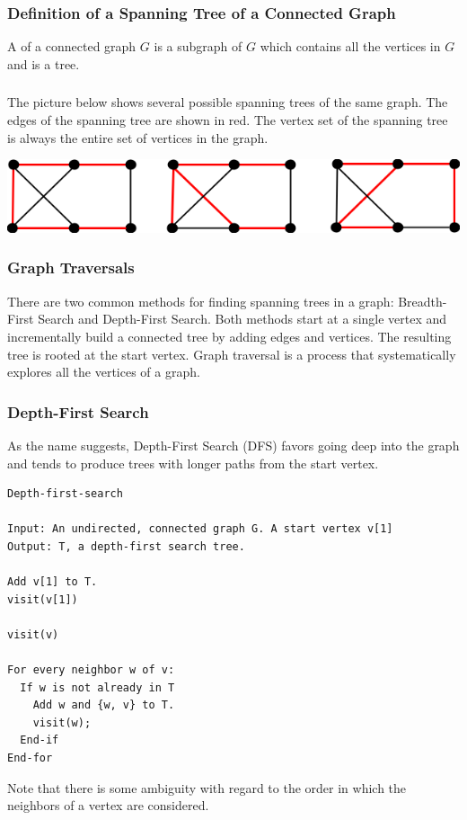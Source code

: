 \subsubsection*{Definition of a Spanning Tree of a Connected Graph}
A  of a connected graph $G$ is a subgraph of $G$ which contains all the vertices in $G$ and is a tree.

\subsubsection*{}
The picture below shows several possible spanning trees of the same graph. The edges of the spanning tree are shown in red. The vertex set of the spanning tree is always the entire set of vertices in the graph.
\begin{center}
  \includegraphics[width=0.6\linewidth]{resources/spanning trees example.png}
\end{center}

\subsubsection*{Graph Traversals}
There are two common methods for finding spanning trees in a graph: Breadth-First Search and Depth-First Search. Both methods start at a single vertex and incrementally build a connected tree by adding edges and vertices. The resulting tree is rooted at the start vertex. Graph traversal is a process that systematically explores all the vertices of a graph.

\subsubsection*{Depth-First Search}
As the name suggests, Depth-First Search (DFS) favors going deep into the graph and tends to produce trees with longer paths from the start vertex.
\begin{lstlisting}
Depth-first-search

Input: An undirected, connected graph G. A start vertex v[1]
Output: T, a depth-first search tree.

Add v[1] to T.
visit(v[1])

visit(v)

For every neighbor w of v:
  If w is not already in T
    Add w and {w, v} to T.
    visit(w);
  End-if
End-for
\end{lstlisting}
Note that there is some ambiguity with regard to the order in which the neighbors of a vertex are considered.

